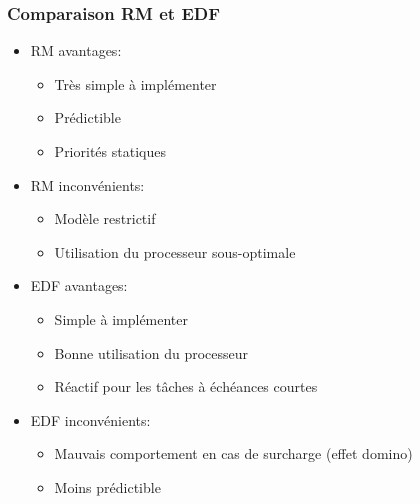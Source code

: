 \documentclass[ignorenonframetext,]{beamer}
\begin{document}
\begin{frame}\frametitle{Comparaison RM et EDF}

\begin{itemize}
\item
  RM avantages:

  \begin{itemize}
  \item
    Très simple à implémenter
  \item
    Prédictible
  \item
    Priorités statiques
  \end{itemize}
\item
  RM inconvénients:

  \begin{itemize}
  \item
    Modèle restrictif
  \item
    Utilisation du processeur sous-optimale
  \end{itemize}
\item
  EDF avantages:

  \begin{itemize}
  \item
    Simple à implémenter
  \item
    Bonne utilisation du processeur
  \item
    Réactif pour les tâches à échéances courtes
  \end{itemize}
\item
  EDF inconvénients:

  \begin{itemize}
  \item
    Mauvais comportement en cas de surcharge (effet domino)
  \item
    Moins prédictible
  \end{itemize}
\end{itemize}

\end{frame}
\end{document}
